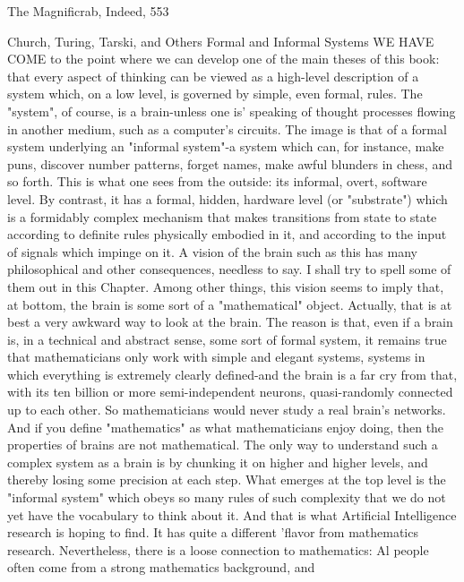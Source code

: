 {   The Magnificrab, Indeed,                                                                   553


                Church, Turing, Tarski, and Others
                          Formal and Informal Systems
WE HAVE COME to the point where we can develop one of the main theses of this
book: that every aspect of thinking can be viewed as a high-level description of a system
which, on a low level, is governed by simple, even formal, rules. The "system", of course,
is a brain-unless one is' speaking of thought processes flowing in another medium, such
as a computer's circuits. The image is that of a formal system underlying an "informal
system"-a system which can, for instance, make puns, discover number patterns, forget
names, make awful blunders in chess, and so forth. This is what one sees from the
outside: its informal, overt, software level. By contrast, it has a formal, hidden, hardware
level (or "substrate") which is a formidably complex mechanism that makes transitions
from state to state according to definite rules physically embodied in it, and according to
the input of signals which impinge on it.
        A vision of the brain such as this has many philosophical and other consequences,
needless to say. I shall try to spell some of them out in this Chapter. Among other things,
this vision seems to imply that, at bottom, the brain is some sort of a "mathematical"
object. Actually, that is at best a very awkward way to look at the brain. The reason is
that, even if a brain is, in a technical and abstract sense, some sort of formal system, it
remains true that mathematicians only work with simple and elegant systems, systems in
which everything is extremely clearly defined-and the brain is a far cry from that, with its
ten billion or more semi-independent neurons, quasi-randomly connected up to each
other. So mathematicians would never study a real brain's networks. And if you define
"mathematics" as what mathematicians enjoy doing, then the properties of brains are not
mathematical.
        The only way to understand such a complex system as a brain is by chunking it on
higher and higher levels, and thereby losing some precision at each step. What emerges at
the top level is the "informal system" which obeys so many rules of such complexity that
we do not yet have the vocabulary to think about it. And that is what Artificial
Intelligence research is hoping to find. It has quite a different 'flavor from mathematics
research. Nevertheless, there is a loose connection to mathematics: Al people often come
from a strong mathematics background, and




}
